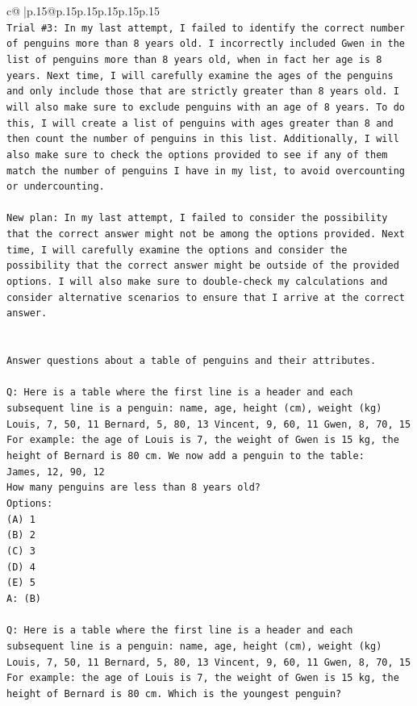 \documentclass{article}
\begin{document}
{\begin{supertabular}{c@{$\;$}|p{.15\linewidth}@{}p{.15\linewidth}p{.15\linewidth}p{.15\linewidth}p{.15\linewidth}p{.15\linewidth}}
{{{\\ 
\texttt{Trial \#3: In my last attempt, I failed to identify the correct number of penguins more than 8 years old. I incorrectly included Gwen in the list of penguins more than 8 years old, when in fact her age is 8 years. Next time, I will carefully examine the ages of the penguins and only include those that are strictly greater than 8 years old. I will also make sure to exclude penguins with an age of 8 years. To do this, I will create a list of penguins with ages greater than 8 and then count the number of penguins in this list. Additionally, I will also make sure to check the options provided to see if any of them match the number of penguins I have in my list, to avoid overcounting or undercounting.} \\
\\ 
\texttt{New plan: In my last attempt, I failed to consider the possibility that the correct answer might not be among the options provided. Next time, I will carefully examine the options and consider the possibility that the correct answer might be outside of the provided options. I will also make sure to double{-}check my calculations and consider alternative scenarios to ensure that I arrive at the correct answer.} \\
\\ 
\\ 
\texttt{Answer questions about a table of penguins and their attributes.} \\
\\ 
\texttt{Q: Here is a table where the first line is a header and each subsequent line is a penguin:  name, age, height (cm), weight (kg) Louis, 7, 50, 11 Bernard, 5, 80, 13 Vincent, 9, 60, 11 Gwen, 8, 70, 15  For example: the age of Louis is 7, the weight of Gwen is 15 kg, the height of Bernard is 80 cm.  We now add a penguin to the table:} \\
\texttt{James, 12, 90, 12} \\
\texttt{How many penguins are less than 8 years old?} \\
\texttt{Options:} \\
\texttt{(A) 1} \\
\texttt{(B) 2} \\
\texttt{(C) 3} \\
\texttt{(D) 4} \\
\texttt{(E) 5} \\
\texttt{A: (B)} \\
\\ 
\texttt{Q: Here is a table where the first line is a header and each subsequent line is a penguin:  name, age, height (cm), weight (kg) Louis, 7, 50, 11 Bernard, 5, 80, 13 Vincent, 9, 60, 11 Gwen, 8, 70, 15  For example: the age of Louis is 7, the weight of Gwen is 15 kg, the height of Bernard is 80 cm.  Which is the youngest penguin?} \\
}}}
\end{supertabular}}
\end{document}
